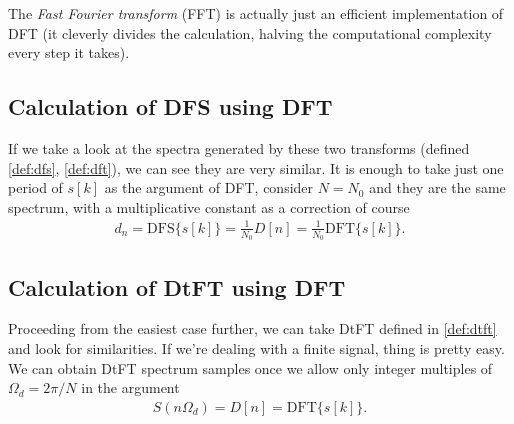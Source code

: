 \documentclass[11pt,a4paper]{report}
\theoremstyle{remark}
\theoremstyle{definition}
\newcommand{\dft}[1]{\mathrm{DFT} \{ #1 \}}
\newcommand{\dfs}[1]{\mathrm{DFS} \{ #1 \}}
\begin{document}
			The \textit{Fast Fourier transform} (FFT) is actually just an efficient implementation of DFT (it cleverly divides the calculation, halving the computational complexity every step it takes).
			
			\subsection{Calculation of DFS using DFT}
				
				If we take a look at the spectra generated by these two transforms (defined \eqref{def:dfs}, \eqref{def:dft}), we can see they are very similar. It is enough to take just one period of $s[k]$ as the argument of DFT, consider $N=N_0$ and they are the same spectrum, with a multiplicative constant as a correction of course
				\begin{align}
					d_n = \dfs{s[k]} = \frac{1}{N_0} D[n] = \frac{1}{N_0} \dft{s[k]}.
				\end{align}
				
			\subsection{Calculation of DtFT using DFT}
				
				Proceeding from the easiest case further, we can take DtFT defined in \eqref{def:dtft} and look for similarities. If we're dealing with a finite signal, thing is pretty easy. We can obtain DtFT spectrum samples once we allow only integer multiples of $\Omega_d = 2\pi/N$ in the argument
				\begin{align}
					S(n \Omega_d) = D[n] = \dft{s[k]}.
				\end{align}
				
\end{document}
